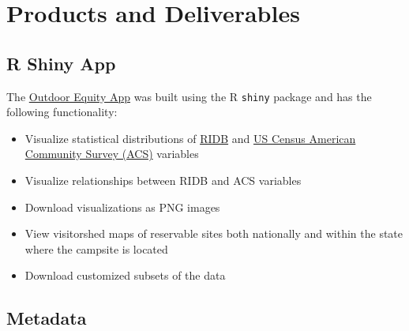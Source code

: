 \documentclass[
]{book}
\providecommand{\tightlist}{%
  \setlength{\itemsep}{0pt}\setlength{\parskip}{0pt}}
\begin{document}
\hypertarget{products-and-deliverables}{%
\chapter{Products and Deliverables}\label{products-and-deliverables}}

\hypertarget{r-shiny-app}{%
\section{R Shiny App}\label{r-shiny-app}}

The \href{https://shinyapps.bren.ucsb.edu/oe_app/}{Outdoor Equity App} was built using the R \texttt{shiny} package \citep{R-shiny} and has the following functionality:

\begin{itemize}
\tightlist
\item
  Visualize statistical distributions of \href{https://ridb.recreation.gov/download}{RIDB} and \href{https://www.census.gov/programs-surveys/acs/data.html}{US Census American Community Survey (ACS)} variables
\item
  Visualize relationships between RIDB and ACS variables
\item
  Download visualizations as PNG images
\item
  View visitorshed maps of reservable sites both nationally and within the state where the campsite is located
\item
  Download customized subsets of the data
\end{itemize}

\hypertarget{metadata}{%
\section{Metadata}\label{metadata}}
\end{document}
